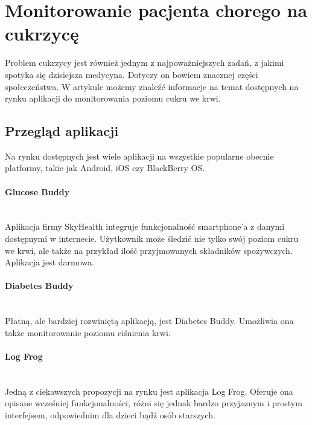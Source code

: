 \section{Monitorowanie pacjenta chorego na cukrzycę}
\label{sec:cukrzyca}

Problem cukrzycy jest również jednym z najpoważniejszych zadań, z jakimi spotyka się dzisiejsza medycyna. Dotyczy on bowiem znacznej części społeczeństwa. W artykule \cite{CDTran2012Smartphone-BasedGlucoseMonitorsandApplicationsintheManagementofDiabetes:AnOverviewof10SalientAppsandaNovelSmartphone-ConnectedBloodGlucoseMonitorUnitedStates--USGlucoseSmartphonesCellulartelephonesDiabetes} możemy znaleźć informacje na temat dostępnych na rynku aplikacji do monitorowania poziomu cukru we krwi.
\subsection{Przegląd aplikacji}
Na rynku dostępnych jest wiele aplikacji na wszystkie popularne obecnie platformy, takie jak Android, iOS czy BlackBerry OS.
\paragraph{Glucose Buddy}\mbox{}\\
Aplikacja firmy SkyHealth integruje funkcjonalność smartphone'a z danymi dostępnymi w internecie. Użytkownik może śledzić nie tylko swój poziom cukru we krwi, ale także na przykład ilość przyjmowanych składników spożywczych. Aplikacja jest darmowa.
\paragraph{Diabetes Buddy}\mbox{}\\
Płatną, ale bardziej rozwiniętą aplikacją, jest Diabetes Buddy. Umożliwia ona także monitorowanie poziomu ciśnienia krwi.
\paragraph{Log Frog}\mbox{}\\
Jedną z ciekawszych propozycji na rynku jest aplikacja Log Frog. Oferuje ona opisane wcześniej funkcjonalności, różni się jednak bardzo przyjaznym i prostym interfejsem, odpowiednim dla dzieci bądź osób starszych.

